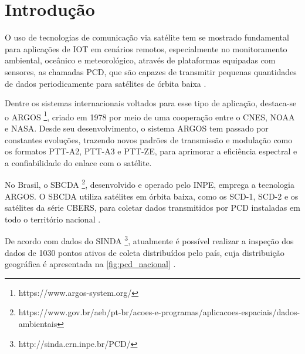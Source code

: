\chapter{Introdução}\label{cap:introducao}

O uso de tecnologias de comunicação via satélite tem se mostrado fundamental para aplicações de \gls{IOT} em cenários remotos, especialmente no monitoramento ambiental, oceânico e meteorológico, através de plataformas equipadas com sensores, as chamadas \gls{PCD}, que são capazes de transmitir pequenas quantidades de dados periodicamente para satélites de órbita baixa \cite{Centenaro-2021, fraire_direct--satellite_2019}.

Dentre os sistemas internacionais voltados para esse tipo de aplicação, destaca-se o \gls{ARGOS} \footnote{https://www.argos-system.org/}, criado em 1978 por meio de uma cooperação entre o \gls{CNES}, \gls{NOAA} e \gls{NASA}. Desde seu desenvolvimento, o sistema \gls{ARGOS} tem passado por constantes evoluções, trazendo novos padrões de transmissão e modulação como os formatos \gls{PTT-A2}, \gls{PTT-A3} e \gls{PTT-ZE}, para aprimorar a eficiência espectral e a confiabilidade do enlace com o satélite. 

No Brasil, o \gls{SBCDA} \footnote{https://www.gov.br/aeb/pt-br/acoes-e-programas/aplicacoes-espaciais/dados-ambientais}, desenvolvido e operado pelo \gls{INPE}, emprega a tecnologia \gls{ARGOS}. O \gls{SBCDA} utiliza satélites em órbita baixa, como os \gls{SCD-1}, \gls{SCD-2} e os satélites da série \gls{CBERS}, para coletar dados transmitidos por \gls{PCD} instaladas em todo o território nacional \cite{rodrigues_demodulador_2018, duarte_multiuser_2021}. 

De acordo com dados do \gls{SINDA} \footnote{http://sinda.crn.inpe.br/PCD/}, atualmente é possível realizar a inspeção dos dados de 1030 pontos ativos de coleta distribuídos pelo país, cuja distribuição geográfica é apresentada na \autoref{fig:pcd_nacional} \cite{silva_um_2022}. 

